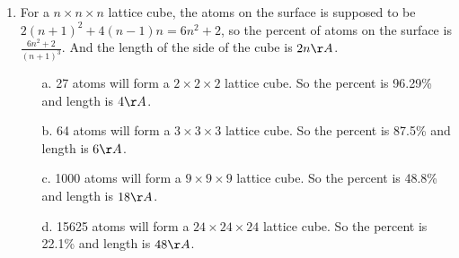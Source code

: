\begin{enumerate}
    \item For a $n\times n\times n$ lattice cube, the atoms on the surface is supposed to be $2(n+1)^2+4(n-1)n=6n^2+2$, so the percent of atoms on the surface is $\frac{6n^2+2}{(n+1)^3}$. And the length of the side of the cube is $2n\AA$.
     \begin{enumerate}
         \item[a.] 27 atoms will form a $2\times 2\times 2$ lattice cube. So the percent is 96.29\% and length is $4\AA$.
         \item[b.] 64 atoms will form a $3\times 3\times 3$ lattice cube. So the percent is 87.5\% and length is $6\AA$.
         \item[c.] 1000 atoms will form a $9\times 9\times 9$ lattice cube. So the percent is 48.8\% and length is $18\AA$.
         \item[d.] 15625 atoms will form a $24\times 24\times 24$ lattice cube. So the percent is 22.1\% and length is $48\AA$.
     \end{enumerate}
 \end{enumerate}


